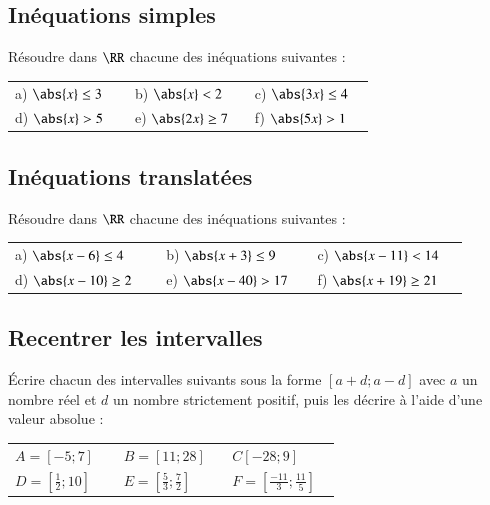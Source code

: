 \documentclass[oneside,12pt]{article}          %
\begin{document}
\subsection{Inéquations simples}
Résoudre dans $\RR$ chacune des inéquations suivantes :

\begin{tabular}{p{0.3\linewidth} p{0.3\linewidth} p{0.3\linewidth}}
	a) $\abs{x}\leq3$ & b) $\abs{x}<2$ & c) $\abs{3x}\leq4$ \\
	d) $\abs{x}>5$ & e) $\abs{2x}\geq7$ & f) $\abs{5x}>1$
\end{tabular}



\subsection{Inéquations translatées}
Résoudre dans $\RR$ chacune des inéquations suivantes :

\begin{tabular}{p{0.3\linewidth} p{0.3\linewidth} p{0.3\linewidth}}
	a) $\abs{x-6}\leq4$ & b) $\abs{x+3}\leq9$ & c) $\abs{x-11}<14$ \\
	d) $\abs{x-10}\geq2$ & e) $\abs{x-40}>17$ & f) $\abs{x+19}\geq21$
\end{tabular}



\subsection{Recentrer les intervalles}
Écrire chacun des intervalles suivants sous la forme $[a+d;a-d]$ avec $a$ un nombre réel et $d$ un nombre strictement positif, puis les décrire à l'aide d'une valeur absolue :

\begin{tabular}{p{0.3\linewidth} p{0.3\linewidth} p{0.3\linewidth}}
	$A=[-5;7]$ & $B=[11;28]$ & $C[-28;9]$ \\
	$D=\left[\frac{1}{2};10\right]$ & $E=\left[\frac{5}{3};\frac{7}{2}\right]$ & $F=\left[\frac{-11}{3};\frac{11}{5}\right]$
\end{tabular}
\end{document}
